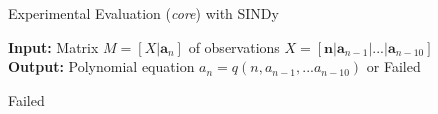 \documentclass[t,usenames,dvipsnames]{beamer} %
\newcommand{\1}{\boldsymbol{1}}
\newcommand{\0}{\boldsymbol{0}}
\begin{document}
\begin{frame}{Experimental Evaluation (\textit{core}) with SINDy}
     
    \begin{algorithm}[H]
        \caption{For experimental comparison of SINDy for \textit{core} case
        }
    \raggedright
        \textbf{Input:} Matrix  $M = [X|\textbf{a}_n]$ of observations 
         $X = [\textbf{n}|\textbf{a}_{n-1}|...|\textbf{a}_{n-10}]$ 
        \\
        \textbf{Output:} Polynomial equation $a_n = q(n, a_{n-1}, ... a_{n-10})$ or Failed
    \begin{algorithmic}[1]
        \EndIf
        \EndIf
    \EndFor
    \State \Return Failed
    \EndFunction
    \end{algorithmic}
    \end{algorithm}
 \end{frame}
\end{document}
